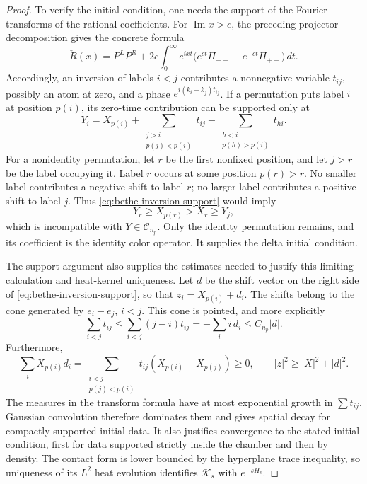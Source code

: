 \begin{proof}
To verify the initial condition, one needs the support of the
Fourier transforms of the rational coefficients.  For
\(\operatorname{Im}x>c\), the preceding projector decomposition gives
the concrete formula
\[
 \check R(x)=P^LP^R+
 2c\int_0^\infty e^{ixt}
       \bigl(e^{ct}\Pi_{--}-e^{-ct}\Pi_{++}\bigr)\,dt.
\]
Accordingly, an inversion of labels \(i<j\) contributes a
nonnegative variable \(t_{ij}\), possibly an atom at zero, and a phase
\(e^{i(k_i-k_j)t_{ij}}\).  If a permutation puts label \(i\) at
position \(p(i)\), its zero-time contribution can be supported only at
\begin{equation}
 Y_i=X_{p(i)}+
       \sum_{\substack{j>i\\p(j)<p(i)}}t_{ij}
       -\sum_{\substack{h<i\\p(h)>p(i)}}t_{hi}.
\label{eq:bethe-inversion-support}
\end{equation}
For a nonidentity permutation, let \(r\) be the first nonfixed
position, and let \(j>r\) be the label occupying it.
Label \(r\) occurs at some position \(p(r)>r\).
No smaller label contributes a negative shift to label \(r\);
no larger label contributes a positive shift to label \(j\).
Thus \eqref{eq:bethe-inversion-support} would imply
\[
                   Y_r\geq X_{p(r)}>X_r\geq Y_j,
\]
which is incompatible with \(Y\in\mathcal C_{n_p}\).
Only the identity permutation remains, and its coefficient is the
identity color operator.  It supplies the delta initial condition.

The support argument also supplies the estimates needed to justify
this limiting calculation and heat-kernel uniqueness.  Let \(d\)
be the shift vector on the right side of
\eqref{eq:bethe-inversion-support}, so that
\(z_i=X_{p(i)}+d_i\).  The shifts belong to the cone generated by
\(e_i-e_j\), \(i<j\).  This cone is pointed, and more explicitly
\[
 \sum_{i<j}t_{ij}
 \leq \sum_{i<j}(j-i)t_{ij}
 =-\sum_i i\,d_i
 \leq C_{n_p}|d|.
\]
Furthermore,
\[
 \sum_i X_{p(i)}d_i
   =\sum_{\substack{i<j\\p(j)<p(i)}}
        t_{ij}(X_{p(i)}-X_{p(j)})\geq0,
 \qquad |z|^2\geq |X|^2+|d|^2.
\]
The measures in the transform formula have at most exponential
growth in \(\sum t_{ij}\).  Gaussian convolution therefore dominates
them and gives spatial decay for compactly supported initial data.
It also justifies convergence to the stated initial condition,
first for data supported strictly inside the chamber and then by
density.  The contact form is lower bounded by the hyperplane trace
inequality, so uniqueness of its \(L^2\) heat evolution identifies
\(\mathcal K_s\) with \(e^{-sH_c}\).


\end{proof}
